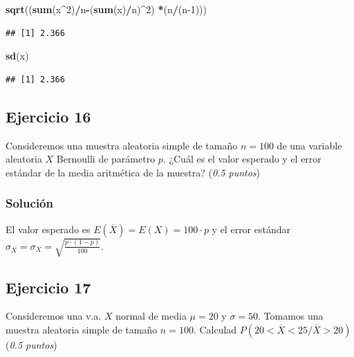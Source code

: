 \documentclass[
]{article}
\newenvironment{Shaded}{\begin{snugshade}}{\end{snugshade}}
\newcommand{\DecValTok}[1]{\textcolor[rgb]{0.00,0.00,0.81}{#1}}
\newcommand{\KeywordTok}[1]{\textcolor[rgb]{0.13,0.29,0.53}{\textbf{#1}}}
\newcommand{\NormalTok}[1]{#1}
\newcommand{\OperatorTok}[1]{\textcolor[rgb]{0.81,0.36,0.00}{\textbf{#1}}}
\begin{document}
\begin{Shaded}
\begin{Highlighting}[]
\KeywordTok{sqrt}\NormalTok{((}\KeywordTok{sum}\NormalTok{(x}\OperatorTok{\^{}}\DecValTok{2}\NormalTok{)}\OperatorTok{/}\NormalTok{n}\OperatorTok{{-}}\NormalTok{(}\KeywordTok{sum}\NormalTok{(x)}\OperatorTok{/}\NormalTok{n)}\OperatorTok{\^{}}\DecValTok{2}\NormalTok{) }\OperatorTok{*}\NormalTok{(n}\OperatorTok{/}\NormalTok{(n}\DecValTok{{-}1}\NormalTok{)))}
\end{Highlighting}
\end{Shaded}

\begin{verbatim}
## [1] 2.366
\end{verbatim}

\begin{Shaded}
\begin{Highlighting}[]
\KeywordTok{sd}\NormalTok{(x)}
\end{Highlighting}
\end{Shaded}

\begin{verbatim}
## [1] 2.366
\end{verbatim}

\hypertarget{ejercicio-16}{%
\subsection{Ejercicio 16}\label{ejercicio-16}}

Consideremos una muestra aleatoria simple de tamaño \(n=100\) de una
variable aleatoria \(X\) Bernoulli de parámetro \(p\). ¿Cuál es el valor
esperado y el error estándar de la media aritmética de la muestra?
(\emph{0.5 puntos})

\hypertarget{soluciuxf3n-15}{%
\subsubsection{Solución}\label{soluciuxf3n-15}}

El valor esperado es \(E(\overline{X}) =E(X)= 100\cdot p\) y el error
estándar
\(\sigma_{\overline{X}} =\sigma_{X}=\sqrt{\frac{p\cdot(1-p)}{100}}.\)

\hypertarget{ejercicio-17}{%
\subsection{Ejercicio 17}\label{ejercicio-17}}

Consideremos una v.a. \(X\) normal de media \(\mu=20\) y \(\sigma=50\).
Tomamos una muestra aleatoria simple de tamaño \(n=100\). Calculad
\(P(20< \overline{X}<25 /\overline{X}>20)\) (\emph{0.5 puntos})
\end{document}
